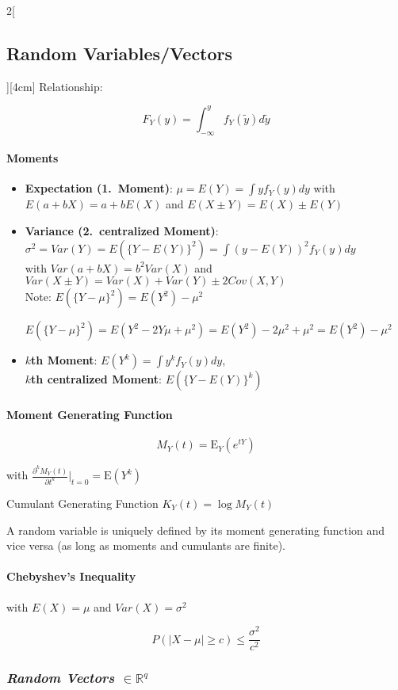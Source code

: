 \documentclass[8pt]{extarticle}
\begin{document}
\begin{multicols}{2}[\subsection{Random Variables/Vectors}][4cm]
Relationship:

$$F_Y(y) = \int_{-\infty}^{y} f_Y(\tilde{y})d\tilde{y}$$



\paragraph{Moments}

\begin{itemize}
\item \textbf{Expectation (1.\ Moment)}: $\mu = E(Y) = \int y f_Y(y)dy$
with $E(a{+}bX) = a+b E(X)$ and $E(X{\pm}Y) = E(X) \pm E(Y)$
\item \textbf{Variance (2.\ centralized Moment)}: $\sigma^2 = Var(Y) = E(\{Y-E(Y)\}^2) = \int (y - E(Y))^2 f_Y(y) dy$ \\
with $Var(a+bX) = b^2Var(X)$ and $Var(X{\pm}Y)= Var(X)+Var(Y)\pm 2 Cov(X,Y)$ \\
Note: $E(\{Y-\mu\}^2) = E(Y^2) - \mu^2$
\begin{Proof}
$E(\{Y-\mu\}^2) = E(Y^2 - 2Y\mu + \mu^2) = E(Y^2) - 2\mu^2 + \mu^2 = E(Y^2) - \mu^2$
\end{Proof}
\item \textbf{$k$th Moment}: $E(Y^k) = \int y^k f_Y(y) dy$,\\ \textbf{$k$th centralized Moment}: $E(\{Y-E(Y)\}^k)$
\end{itemize}

\paragraph{Moment Generating Function }

$$M_Y(t) = \mathrm{E}_Y(e^{tY})$$

with $\frac{\partial^kM_Y(t)}{\partial t^k} \bigg|_{t = 0} = \mathrm{E}(Y^k)$ 

Cumulant Generating Function $K_Y(t) = \log M_Y(t)$

\noindent A random variable is uniquely defined by its moment generating function and vice versa (as long as moments and cumulants are finite).

\paragraph{Chebyshev's Inequality}
with $E(X) =\mu$ and $Var(X) = \sigma^2$

$$P(|X-\mu| \geq c) \leq \frac{\sigma^2}{c^2}$$
  
\subsubsection*{\textit{Random Vectors $\in \mathbb{R}^q$}}


\end{multicols}
\end{document}
